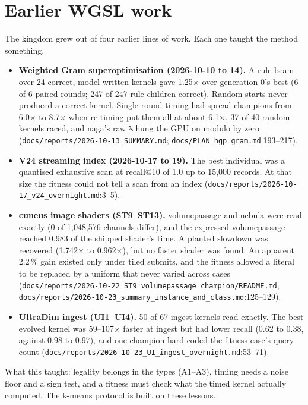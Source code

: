 \documentclass[sigconf,nonacm]{acmart}
\newcommand{\src}[1]{{\footnotesize\nolinkurl{#1}}}
\begin{document}
\section{Earlier WGSL work}
\label{sec:earlier}

The kingdom grew out of four earlier lines of work. Each one taught the
method something.
\begin{itemize}
\item \textbf{Weighted Gram superoptimisation (2026-10-10 to 14).} A rule
  beam over 24 correct, model-written kernels gave 1.25$\times$ over generation
  0's best (6 of 6 paired rounds; 247 of 247 rule children correct). Random
  starts never produced a correct kernel. Single-round timing had spread
  champions from 6.0$\times$ to 8.7$\times$ when re-timing put them all at about
  6.1$\times$. 37 of 40 random kernels raced, and naga's raw \texttt{\%} hung the GPU
  on modulo by zero (\src{docs/reports/2026-10-13_SUMMARY.md};
  \src{docs/PLAN_hgp_gram.md}:193--217).
\item \textbf{V24 streaming index (2026-10-17 to 19).} The best individual was
  a quantised exhaustive scan at recall@10 of 1.0 up to 15,000 records. At that
  size the fitness could not tell a scan from an index
  (\src{docs/reports/2026-10-17_v24_overnight.md}:3--5).
\item \textbf{cuneus image shaders (ST9--ST13).} volumepassage and nebula were
  read exactly (0 of 1,048,576 channels differ), and the expressed volumepassage
  reached 0.983 of the shipped shader's time. A planted slowdown was recovered
  (1.742$\times$ to 0.962$\times$), but no faster shader was found. An apparent
  2.2\,\% gain existed only under tiled submits, and the fitness allowed a literal
  to be replaced by a uniform that never varied across cases
  (\src{docs/reports/2026-10-22_ST9_volumepassage_champion/README.md};
  \src{docs/reports/2026-10-23_summary_instance_and_class.md}:125--129).
\item \textbf{UltraDim ingest (UI1--UI4).} 50 of 67 ingest kernels read
  exactly. The best evolved kernel was 59--107$\times$ faster at ingest but had
  lower recall (0.62 to 0.38, against 0.98 to 0.97), and one champion
  hard-coded the fitness case's query count
  (\src{docs/reports/2026-10-23_UI_ingest_overnight.md}:53--71).
\end{itemize}
What this taught: legality belongs in the types (A1--A3), timing needs a noise
floor and a sign test, and a fitness must check what the timed kernel actually
computed. The k-means protocol is built on these lessons.
\end{document}
